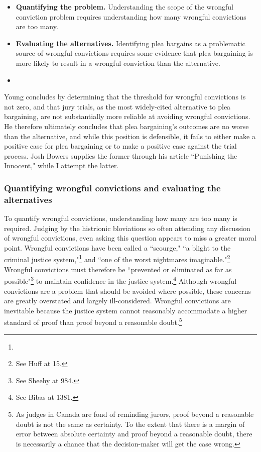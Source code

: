 \begin{itemize}
    \item \textbf{Quantifying the problem.} Understanding the scope of the wrongful conviction problem requires understanding how many wrongful convictions are too many.
    \item \textbf{Evaluating the alternatives.} Identifying plea bargains as a problematic source of wrongful convictions requires some evidence that plea bargaining is more likely to result in a wrongful conviction than the alternative.
    \item 
\end{itemize}

Young concludes by determining that the threshold for wrongful convictions is not zero, and that jury trials, as the most widely-cited alternative to plea bargaining, are not substantially more reliable at avoiding wrongful convictions. He therefore ultimately concludes that plea bargaining's outcomes are no worse than the alternative, and while this position is defensible, it fails to either make a positive case for plea bargaining or to make a positive case against the trial process. Josh Bowers supplies the former through his article ``Punishing the Innocent," while I attempt the latter.

\subsubsection{Quantifying wrongful convictions and evaluating the alternatives}



To quantify wrongful convictions, understanding how many are too many is required. Judging by the histrionic bloviations so often attending any discussion of wrongful convictions, even asking this question appears to miss a greater moral point. Wrongful convictions have been called a ``scourge," ``a blight to the criminal justice system,"\footnote{} and ``one of the worst nightmares imaginable."\footnote{See Huff at 15.} Wrongful convictions must therefore be ``prevented or eliminated as far as possible"\footnote{See Sheehy at 984.} to maintain confidence in the justice system.\footnote{See Bibas at 1381.} Although wrongful convictions are a problem that should be avoided where possible, these concerns are greatly overstated and largely ill-considered. Wrongful convictions are inevitable because the justice system cannot reasonably accommodate a higher standard of proof than proof beyond a reasonable doubt.\footnote{As judges in Canada are fond of reminding jurors, proof beyond a reasonable doubt is not the same as certainty. To the extent that there is a margin of error between absolute certainty and proof beyond a reasonable doubt, there is necessarily a chance that the decision-maker will get the case wrong.} 

